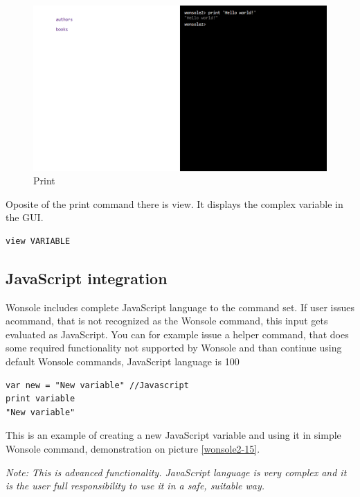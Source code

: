 \begin{figure}
\centering
\includegraphics[width=\textwidth]{../../manual/screenshot/wonsole2/wonsole2-10.png}
\caption{Print}
\label{wonsole2-10}
\end{figure}

Oposite of the print command there is view. It displays the complex variable in
the GUI.
\begin{verbatim}
view VARIABLE
\end{verbatim}

\subsection{JavaScript integration}
Wonsole includes complete JavaScript language to the command set. If user issues
acommand, that is not recognized as the Wonsole command, this input gets
evaluated as JavaScript. You can for example issue a helper command, that does
some required functionality not supported by Wonsole and than continue using
default Wonsole commands, JavaScript language is 100%

\begin{verbatim}
var new = "New variable" //Javascript
print variable
"New variable"
\end{verbatim}

This is an example of creating a new JavaScript variable and using it in simple
Wonsole command, demonstration on picture \ref{wonsole2-15}.

\textit{Note: This is advanced functionality. JavaScript language is very
complex and it is the user full responsibility to use it in a safe, suitable
way.}
 

